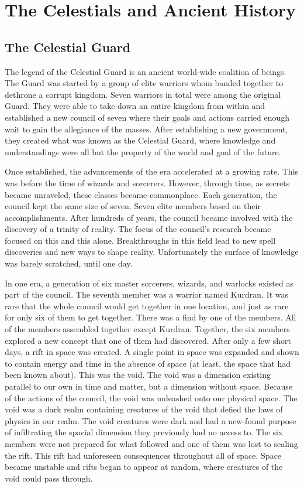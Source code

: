\chapter{The Celestials and Ancient History}

\section{The Celestial Guard}

The legend of the Celestial Guard is an ancient world-wide coalition of beings. The Guard was started by a group of elite warriors whom banded together to dethrone a corrupt kingdom. Seven warriors in total were among the original Guard. They were able to take down an entire kingdom from within and established a new council of seven where their goals and actions carried enough wait to gain the allegiance of the masses. After establishing a new government, they created what was known as the Celestial Guard, where knowledge and understandings were all but the property of the world and goal of the future. 

Once established, the advancements of the era accelerated at a growing rate. This was before the time of wizards and sorcerers. However, through time, as secrets became unraveled, these classes became commonplace. Each generation, the council kept the same size of seven. Seven elite members based on their accomplishments. After hundreds of years, the council became involved with the discovery of a trinity of reality. The focus of the council's research became focused on this and this alone. Breakthroughs in this field lead to new spell discoveries and new ways to shape reality. Unfortunately the surface of knowledge was barely scratched, until one day.

In one era, a generation of six master sorcerers, wizards, and warlocks existed as part of the council. The seventh member was a warrior named Kurdran. It was rare that the whole council would get together in one location, and just as rare for only six of them to get together. There was a find by one of the members. All of the members assembled together except Kurdran. Together, the six members explored a new concept that one of them had discovered. After only a few short days, a rift in space was created. A single point in space was expanded and shown to contain energy and time in the absence of space (at least, the space that had been known about). This was the void. The void was a dimension existing parallel to our own in time and matter, but a dimension without space. Because of the actions of the council, the void was unleashed onto our physical space. The void was a dark realm containing creatures of the void that defied the laws of physics in our realm. The void creatures were dark and had a new-found purpose of infiltrating the spacial dimension they previously had no access to. The six members were not prepared for what followed and one of them was lost to sealing the rift. This rift had unforeseen consequences throughout all of space. Space became unstable and rifts began to appear at random, where creatures of the void could pass through.


